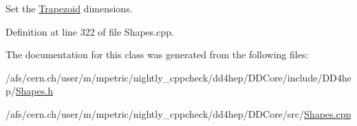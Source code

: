Set the \hyperlink{class_d_d4hep_1_1_geometry_1_1_trapezoid}{Trapezoid} dimensions. 



Definition at line 322 of file Shapes.\+cpp.



The documentation for this class was generated from the following files\+:\begin{DoxyCompactItemize}
\item 
/afs/cern.\+ch/user/m/mpetric/nightly\+\_\+cppcheck/dd4hep/\+D\+D\+Core/include/\+D\+D4hep/\hyperlink{_shapes_8h}{Shapes.\+h}\item 
/afs/cern.\+ch/user/m/mpetric/nightly\+\_\+cppcheck/dd4hep/\+D\+D\+Core/src/\hyperlink{_shapes_8cpp}{Shapes.\+cpp}\end{DoxyCompactItemize}

